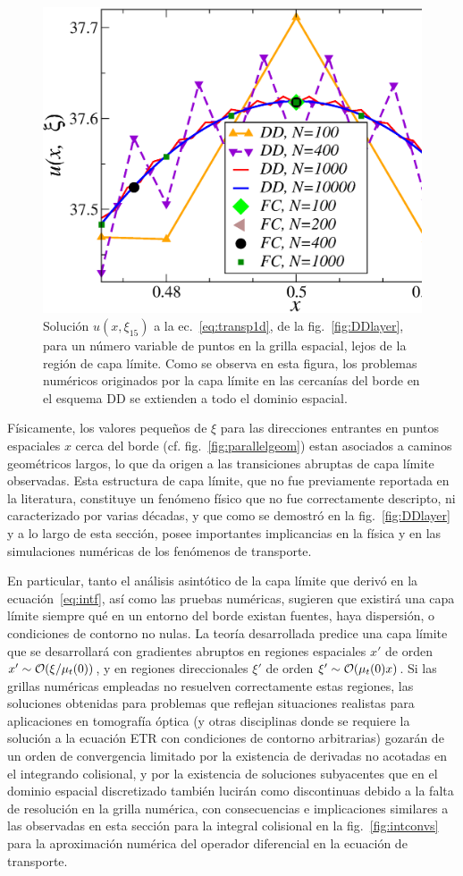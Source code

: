 \begin{figure}[h!]
\centering
  \includegraphics[width=0.5\linewidth]{figuras/conv_2.eps}
  \caption{Solución $u(x,\xi_{15})$ a la ec.~\eqref{eq:transp1d}, 
  de la fig.~\ref{fig:DDlayer}, para un número variable 
  de puntos en la grilla espacial, lejos de la región de capa límite. 
  Como se observa en esta figura, 
  los problemas numéricos originados por la capa límite en 
  las cercanías del borde 
  en el esquema DD se extienden a todo el dominio espacial.}
 \label{fig:DDlayer2}
\end{figure}

Físicamente, los valores pequeños de $\xi$ para las direcciones 
entrantes en puntos espaciales $x$ cerca del borde (cf. fig.~\ref{fig:parallelgeom}) 
estan asociados a caminos geométricos largos, lo que da origen 
a las transiciones abruptas de capa límite observadas.
Esta estructura de capa límite, que no fue previamente reportada 
en la literatura, constituye un fenómeno físico que no fue correctamente 
descripto, ni caracterizado por varias décadas, y que como se demostró 
en la fig.~\ref{fig:DDlayer} y a lo largo de esta sección, 
posee importantes implicancias en la física y en las simulaciones 
numéricas de los fenómenos de transporte.

En particular, tanto el análisis asintótico de la capa límite que 
derivó en la ecuación~\eqref{eq:intf}, 
así como las pruebas numéricas, sugieren que existirá una capa límite 
siempre qué en un entorno del borde existan fuentes, haya dispersión, 
o condiciones de contorno no nulas. La teoría desarrollada predice 
una capa límite que se desarrollará con gradientes abruptos en regiones 
espaciales $x'$ de orden $x'\sim \mathcal{O}(\xi/\mu_t(0))$, y en regiones direccionales $\xi'$  
de orden $\xi'\sim \mathcal{O}(\mu_t(0) x)$. Si las grillas numéricas empleadas no resuelven 
correctamente estas regiones, las soluciones obtenidas para problemas 
que reflejan situaciones realistas para aplicaciones en tomografía óptica 
(y otras disciplinas donde se requiere la solución a la ecuación ETR con 
condiciones de contorno arbitrarias) gozarán de un orden de convergencia 
limitado por la existencia de derivadas no acotadas en el integrando 
colisional, y por la existencia de soluciones subyacentes que en el dominio 
espacial discretizado también lucirán como discontinuas debido a la falta de resolución 
en la grilla numérica, 
con consecuencias e implicaciones similares a las observadas 
en esta sección para la integral colisional en la fig.~\ref{fig:intconvs} 
para la aproximación 
numérica del operador diferencial en la ecuación de transporte. 

